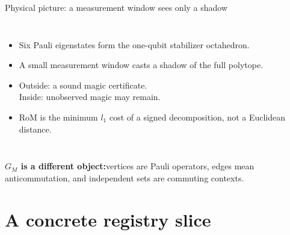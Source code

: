\documentclass[aspectratio=169]{beamer}
\begin{document}
\begin{frame}{Physical picture: a measurement window sees only a shadow}
  \begin{columns}[T,onlytextwidth]
      \begin{itemize}\setlength{\itemsep}{0.22em}
        \item Six Pauli eigenstates form the one-qubit stabilizer octahedron.
        \item A small measurement window casts a shadow of the full polytope.
        \item Outside: a sound magic certificate.\\Inside: unobserved magic may remain.
        \item RoM is the minimum $l_1$ cost of a signed decomposition, not a Euclidean distance.
      \end{itemize}
  \end{columns}
  \vspace{0.02em}
  \colorbox{accentlite}{\parbox{0.92\linewidth}{\centering\scriptsize\textbf{$G_M$ is a different object:}\;vertices are Pauli operators, edges mean anticommutation, and independent sets are commuting contexts.}}
\end{frame}

\section{A concrete registry slice}
\end{document}
